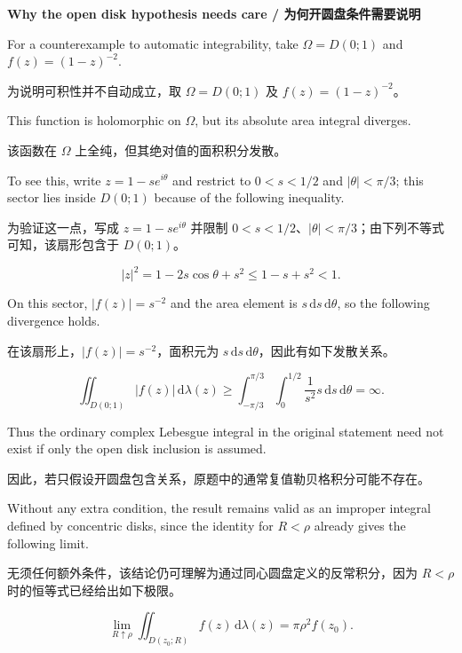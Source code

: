 \documentclass[11pt,a4paper]{ctexart}
\newcommand{\pair}[2]{\par\noindent #1\par\nopagebreak[3]\noindent #2\par}
\newcommand{\heading}[2]{\par\medskip\textbf{#1 / #2}\par\nopagebreak[4]}
\newcommand{\dd}{\,\mathrm d}
\begin{document}
\heading{Why the open disk hypothesis needs care}{为何开圆盘条件需要说明}
\pair{For a counterexample to automatic integrability, take $\Omega=D(0;1)$ and $f(z)=(1-z)^{-2}$.}{为说明可积性并不自动成立，取 $\Omega=D(0;1)$ 及 $f(z)=(1-z)^{-2}$。}
\pair{This function is holomorphic on $\Omega$, but its absolute area integral diverges.}{该函数在 $\Omega$ 上全纯，但其绝对值的面积积分发散。}
\pair{To see this, write $z=1-se^{i\theta}$ and restrict to $0<s<1/2$ and $|\theta|<\pi/3$; this sector lies inside $D(0;1)$ because of the following inequality.}{为验证这一点，写成 $z=1-se^{i\theta}$ 并限制 $0<s<1/2$、$|\theta|<\pi/3$；由下列不等式可知，该扇形包含于 $D(0;1)$。}
\[
|z|^2=1-2s\cos\theta+s^2\le1-s+s^2<1.
\]
\pair{On this sector, $|f(z)|=s^{-2}$ and the area element is $s\,\mathrm ds\,\mathrm d\theta$, so the following divergence holds.}{在该扇形上，$|f(z)|=s^{-2}$，面积元为 $s\,\mathrm ds\,\mathrm d\theta$，因此有如下发散关系。}
\[
\iint_{D(0;1)}|f(z)|\dd\lambda(z)
\ge\int_{-\pi/3}^{\pi/3}\int_0^{1/2}\frac{1}{s^2}s\dd s\dd\theta
=\infty.
\]
\pair{Thus the ordinary complex Lebesgue integral in the original statement need not exist if only the open disk inclusion is assumed.}{因此，若只假设开圆盘包含关系，原题中的通常复值勒贝格积分可能不存在。}
\pair{Without any extra condition, the result remains valid as an improper integral defined by concentric disks, since the identity for $R<\rho$ already gives the following limit.}{无须任何额外条件，该结论仍可理解为通过同心圆盘定义的反常积分，因为 $R<\rho$ 时的恒等式已经给出如下极限。}
\[
\lim_{R\uparrow\rho}\iint_{D(z_0;R)}f(z)\dd\lambda(z)
=\pi\rho^2 f(z_0).
\]
\end{document}
